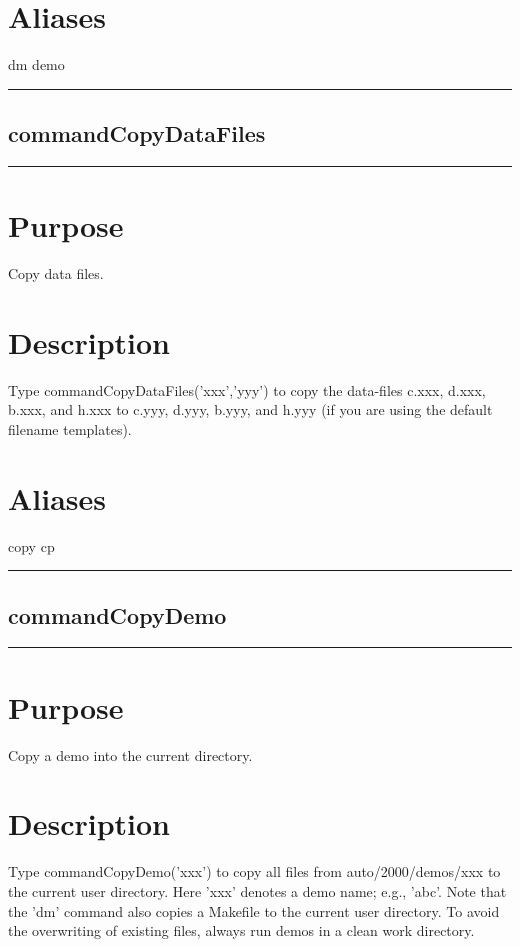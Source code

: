 \documentclass[12pt]{report}
\begin{document}
\begin{minipage}{6in}
    \section*{Aliases}
dm demo \medskip\hrule\end{minipage}\subsection{commandCopyDataFiles} \label{sec:clui_ref_commandCopyDataFiles}\begin{minipage}{6in}\hrule\medskip\section*{Purpose}
Copy data files.\section*{Description}

    Type commandCopyDataFiles('xxx','yyy') to copy the data-files c.xxx, d.xxx, b.xxx,
    and h.xxx to c.yyy, d.yyy, b.yyy, and h.yyy (if you are using the
    default filename templates).
    \section*{Aliases}
copy cp \medskip\hrule\end{minipage}\subsection{commandCopyDemo} \label{sec:clui_ref_commandCopyDemo}\begin{minipage}{6in}\hrule\medskip\section*{Purpose}
Copy a demo into the current directory.\section*{Description}

    Type commandCopyDemo('xxx') to copy all files from auto/2000/demos/xxx to the
    current user directory.  Here 'xxx' denotes a demo name; e.g.,
    'abc'.  Note that the 'dm' command also copies a Makefile to the
    current user directory. To avoid the overwriting of existing
    files, always run demos in a clean work directory.

\end{minipage}
\end{document}
